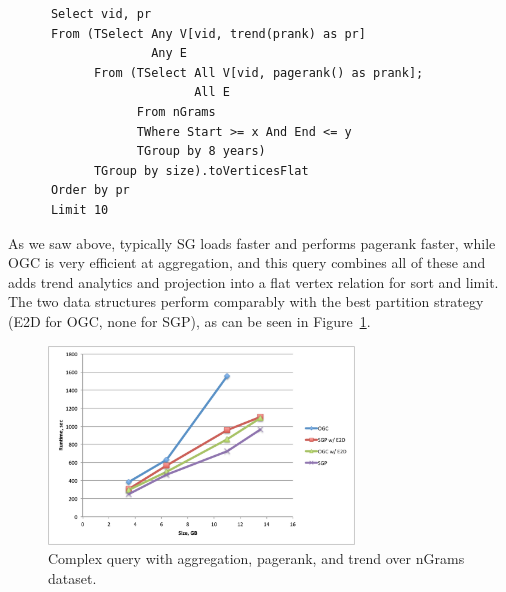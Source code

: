 \begin{small}
\begin{verbatim}
      Select vid, pr
      From (TSelect Any V[vid, trend(prank) as pr]
                    Any E
            From (TSelect All V[vid, pagerank() as prank]; 
                          All E
                  From nGrams
                  TWhere Start >= x And End <= y
                  TGroup by 8 years)
            TGroup by size).toVerticesFlat
      Order by pr
      Limit 10
\end{verbatim}
\end{small}

As we saw above, typically SG loads faster and performs pagerank
faster, while OGC is very efficient at aggregation, and this query
combines all of these and adds trend analytics and projection into a
flat vertex relation for sort and limit.  The two data structures
perform comparably with the best partition strategy (E2D for OGC, none
for SGP), as can be seen in Figure~\ref{fig:complexq}.

\begin{figure}[t]
\includegraphics[width=3.2in]{figs/complexq.pdf}
\caption{Complex query with aggregation, pagerank, and trend over
  nGrams dataset.}
\label{fig:complexq}
\end{figure}

